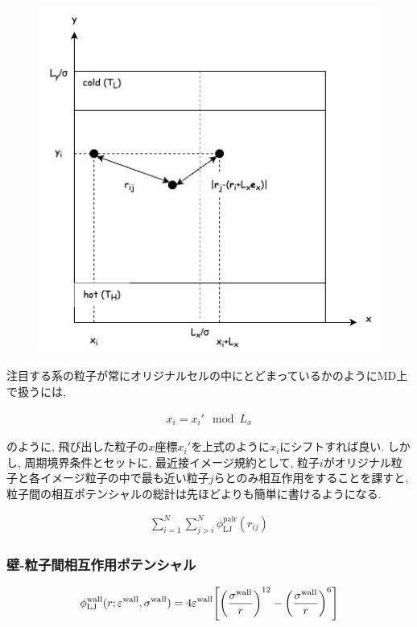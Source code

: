 \documentclass[dvipdfmx]{jsarticle}
\numberwithin{equation}{subsection}
\begin{document}
\begin{figure}[H]
  \centering
  \caption{}
  \label{fig:system_periodic}
  \includegraphics[scale=0.7]{image/system_periodic.jpg}
\end{figure}

注目する系の粒子が常にオリジナルセルの中にとどまっているかのようにMD上で扱うには,

\begin{align}
  x_{i} = x_{i}' \mod L_{x}
\end{align}

のように,  飛び出した粒子の$x$座標$x_{i}'$を上式のように$x_i$にシフトすれば良い. しかし, 周期境界条件とセットに, 最近接イメージ規約として, 粒子$i$がオリジナル粒子と各イメージ粒子の中で最も近い粒子$j$らとのみ相互作用をすることを課すと, 粒子間の相互ポテンシャルの総計は先ほどよりも簡単に書けるようになる.

\begin{align}
  \sum_{i=1}^{N} \sum_{j > i}^{N} \phi_{\text{LJ}}^{\text{pair}} (r_{ij})
\end{align}

\subsubsection{壁-粒子間相互作用ポテンシャル}

\begin{align}
  \phi_{\text{LJ}}^{\text{wall}}(r; \varepsilon^{\text{wall}}, \sigma^{\text{wall}}) = 4\varepsilon^{\text{wall}} \qty[\qty(\frac{\sigma^{\text{wall}}}{r})^{12} - \qty(\frac{\sigma^{\text{wall}}}{r})^{6} ] \\
\end{align}
\end{document}
